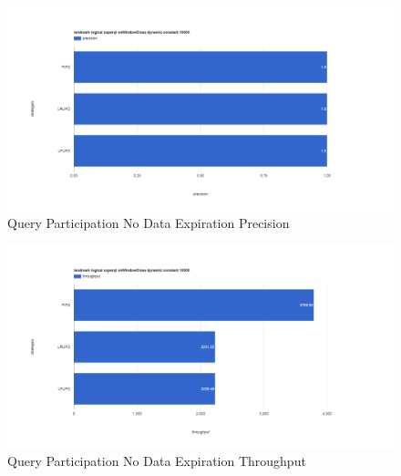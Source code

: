 \begin{figure}[!htbp]
    \centering
    \includegraphics[width=\textwidth]{img/app3-qp-no-p.png}
    \caption{Query Participation No Data Expiration Precision}
\end{figure}
\begin{figure}[!htbp]
    \centering
    \includegraphics[width=\textwidth]{img/app3-qp-no-t.png}
    \caption{Query Participation No Data Expiration Throughput}
\end{figure}